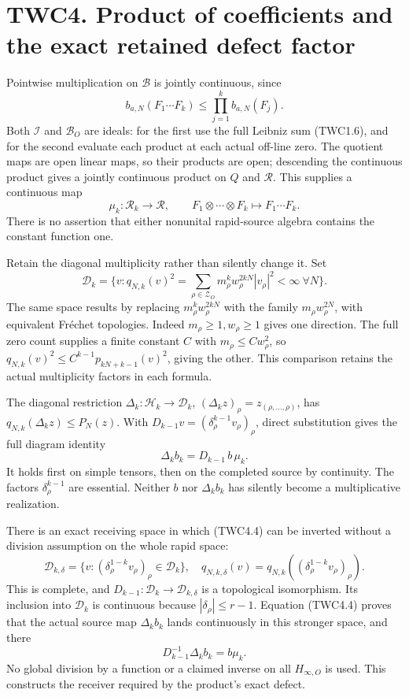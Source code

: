 \section{TWC4. Product of coefficients and the exact retained defect
factor}\label{twc4.-product-of-coefficients-and-the-exact-retained-defect-factor}

Pointwise multiplication on \(\mathcal B\) is jointly continuous, since
\[
b_{a,N}(F_1\cdots F_k)\le\prod_{j=1}^k b_{a,N}(F_j).
\tag{TWC4.1}
\] Both \(\mathcal I\) and \(\mathcal B_O\) are ideals: for the first
use the full Leibniz sum (TWC1.6), and for the second evaluate each
product at each actual off-line zero. The quotient maps are open linear
maps, so their products are open; descending the continuous product
gives a jointly continuous product on \(Q\) and \(\mathcal R\). This
supplies a continuous map \[
\mu_k:\mathscr R_k\to\mathcal R,\qquad
F_1\otimes\cdots\otimes F_k\mapsto F_1\cdots F_k.
\tag{TWC4.2}
\] There is no assertion that either nonunital rapid-source algebra
contains the constant function one.

Retain the diagonal multiplicity rather than silently change it. Set \[
\mathscr D_k=\{v:q_{N,k}(v)^2=\sum_{\rho\in\mathscr Z_O}
m_\rho^k w_\rho^{2kN}|v_\rho|^2<\infty\ \forall N\}.
\tag{TWC4.3}
\] The same space results by replacing \(m_\rho^kw_\rho^{2kN}\) with the
family \(m_\rho w_\rho^{2N}\), with equivalent Fréchet topologies.
Indeed \(m_\rho\ge1,w_\rho\ge1\) gives one direction. The full zero
count supplies a finite constant \(C\) with \(m_\rho\le Cw_\rho^2\), so
\(q_{N,k}(v)^2\le C^{k-1}p_{kN+k-1}(v)^2\), giving the other. This
comparison retains the actual multiplicity factors in each formula.

The diagonal restriction \(\Delta_k:\mathscr H_k\to\mathscr D_k\),
\((\Delta_kz)_\rho=z_{(\rho,\ldots,\rho)}\), has
\(q_{N,k}(\Delta_kz)\le P_N(z)\). With
\(D_{k-1}v=(\delta_\rho^{k-1}v_\rho)_\rho\), direct substitution gives
the full diagram identity \[
\boxed{\quad\Delta_k b_k=D_{k-1}\,b\,\mu_k.\quad}
\tag{TWC4.4}
\] It holds first on simple tensors, then on the completed source by
continuity. The factors \(\delta_\rho^{k-1}\) are essential. Neither
\(b\) nor \(\Delta_kb_k\) has silently become a multiplicative
realization.

There is an exact receiving space in which (TWC4.4) can be inverted
without a division assumption on the whole rapid space: \[
\mathscr D_{k,\delta}=\{v:(\delta_\rho^{1-k}v_\rho)_\rho\in\mathscr D_k\},\quad
q_{N,k,\delta}(v)=q_{N,k}((\delta_\rho^{1-k}v_\rho)_\rho).
\tag{TWC4.5}
\] This is complete, and
\(D_{k-1}:\mathscr D_k\to\mathscr D_{k,\delta}\) is a topological
isomorphism. Its inclusion into \(\mathscr D_k\) is continuous because
\(|\delta_\rho|\le r-1\). Equation (TWC4.4) proves that the actual
source map \(\Delta_kb_k\) lands continuously in this stronger space,
and there \[
D_{k-1}^{-1}\Delta_kb_k=b\mu_k.
\tag{TWC4.6}
\] No global division by a function or a claimed inverse on all
\(H_{\infty,O}\) is used. This constructs the receiver required by the
product's exact defect.

